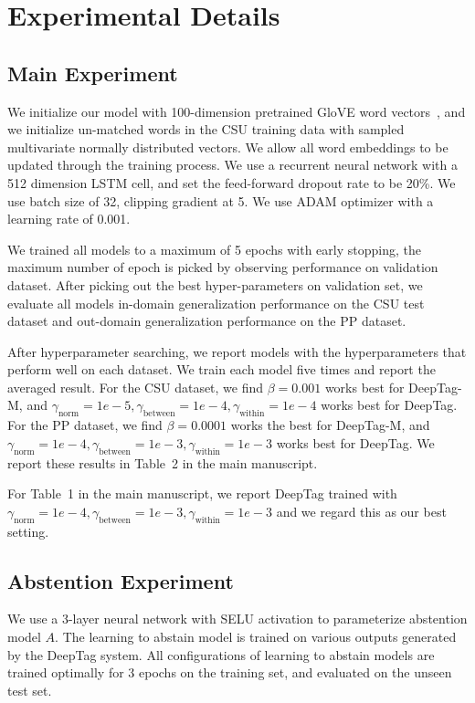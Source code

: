 \documentclass{article}[11pt,oneside]
\begin{document}
\section{Experimental Details}

\subsection{Main Experiment}

We initialize our model with 100-dimension pretrained GloVE word vectors~\cite{pennington2014glove}, and we initialize un-matched words in the CSU training data with sampled multivariate normally distributed vectors. We allow all word embeddings to be updated through the training process. We use a recurrent neural network with a 512 dimension LSTM cell, and set the feed-forward dropout rate to be 20\%. We use batch size of 32, clipping gradient at 5. We use ADAM \cite{kingma2014adam} optimizer with a learning rate of 0.001. 

We trained all models to a maximum of 5 epochs with early stopping, the maximum number of epoch is picked by observing performance on validation dataset. After picking out the best hyper-parameters on validation set,  we evaluate all models in-domain generalization performance on the CSU test dataset and out-domain generalization performance on the PP dataset.

After hyperparameter searching, we report models with the hyperparameters that perform well on each dataset. We train each model five times and report the averaged result.
For the CSU dataset, we find $\beta=0.001$ works best for DeepTag-M, and $\gamma_\text{norm}=1e-5, \gamma_\text{between}=1e-4, \gamma_\text{within}=1e-4$ works best for DeepTag.
For the PP dataset, we find $\beta=0.0001$ works the best for DeepTag-M, and $\gamma_\text{norm}=1e-4, \gamma_\text{between}=1e-3, \gamma_\text{within}=1e-3$ works best for DeepTag. We report these results in Table~2 in the main manuscript.

For Table~1 in the main manuscript, we report DeepTag trained with  $\gamma_\text{norm}=1e-4, \gamma_\text{between}=1e-3, \gamma_\text{within}=1e-3$ and we regard this as our best setting.

\subsection{Abstention Experiment}

We use a 3-layer neural network with SELU activation \cite{klambauer2017self} to parameterize abstention model $A$. The learning to abstain model is trained on various outputs generated by the DeepTag system. All configurations of learning to abstain models are trained optimally for 3 epochs on the training set, and evaluated on the unseen test set.
\end{document}
